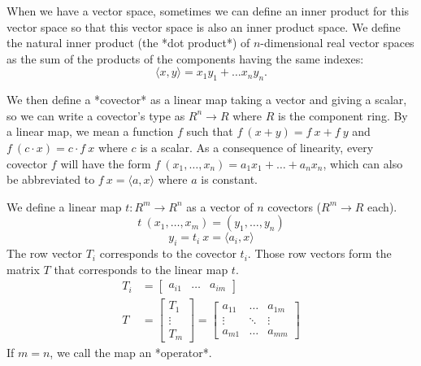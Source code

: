 When we have a vector space,
sometimes we can define an inner product for this vector space
so that this vector space is also an
inner product space.
We define the natural inner product (the *dot product*) of $n$-dimensional real vector spaces as
the sum of the products of the components having the same indexes:
\[
\langle x, y \rangle = x_1 y_1 + \ldots x_n y_n.
\]

We then define a *covector* as a linear map taking a vector and giving a scalar,
so we can write a covector's type as $R^n \to R$ where $R$ is the component ring.
By a linear map, we mean a function $f$ such that $f~(x+y) = f~x + f~y$
and $f~(c \cdot x) = c \cdot f~x$ where $c$ is a scalar.
As a consequence of linearity, every covector $f$ will have the form
$f~(x_1,\ldots,x_n) = a_1 x_1 + \ldots + a_n x_n$,
which can also be abbreviated to $f~x = \langle a,x\rangle$
where $a$ is constant.

We define a linear map $t : R^m \to R^n$
as a vector of $n$ covectors ($R^m \to R$ each).
\[
t~(x_1,\ldots,x_m) = (y_1,\ldots,y_n)
\]
\[
y_i = t_i~x = \langle a_i, x \rangle
\]
The row vector $T_i$ corresponds to the covector $t_i$.
Those row vectors form the matrix $T$
that corresponds to the linear map $t$.
\begin{align*}
T_i &= \begin{bmatrix}a_{i1} & \ldots & a_{im}\end{bmatrix}
\\ T &= \begin{bmatrix}T_1\\\vdots\\T_m\end{bmatrix}
= \begin{bmatrix}a_{11} & \ldots & a_{1m} \\ \vdots & \ddots & \vdots \\ a_{m1} & \ldots & a_{mm}\end{bmatrix}
\end{align*}
If $m = n$, we call the map an *operator*.

